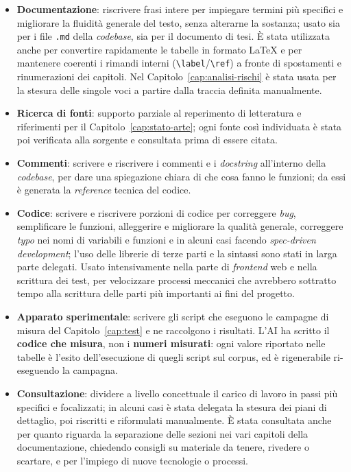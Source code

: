 \begin{itemize}
	\item \textbf{Documentazione}: riscrivere frasi intere per impiegare termini più specifici e migliorare la fluidità generale del testo, senza alterarne la sostanza; usato sia per i file \texttt{.md} della \textit{codebase}, sia per il documento di tesi. È stata utilizzata anche per convertire rapidamente le tabelle in formato \LaTeX{} e per mantenere coerenti i rimandi interni (\texttt{\textbackslash label}/\texttt{\textbackslash ref}) a fronte di spostamenti e rinumerazioni dei capitoli. Nel Capitolo~\ref{cap:analisi-rischi} è stata usata per la stesura delle singole voci a partire dalla traccia definita manualmente.
	\item \textbf{Ricerca di fonti}: supporto parziale al reperimento di letteratura e riferimenti per il Capitolo~\ref{cap:stato-arte}; ogni fonte così individuata è stata poi verificata alla sorgente e consultata prima di essere citata.
	\item \textbf{Commenti}: scrivere e riscrivere i commenti e i \textit{docstring} all'interno della \textit{codebase}, per dare una spiegazione chiara di che cosa fanno le funzioni; da essi è generata la \textit{reference} tecnica del codice.
	\item \textbf{Codice}: scrivere e riscrivere porzioni di codice per correggere \textit{bug}, semplificare le funzioni, alleggerire e migliorare la qualità generale, correggere \textit{typo} nei nomi di variabili e funzioni e in alcuni casi facendo \textit{spec-driven development}; l'uso delle librerie di terze parti e la sintassi sono stati in larga parte delegati. Usato intensivamente nella parte di \textit{frontend} web e nella scrittura dei test, per velocizzare processi meccanici che avrebbero sottratto tempo alla scrittura delle parti più importanti ai fini del progetto.
	\item \textbf{Apparato sperimentale}: scrivere gli script che eseguono le campagne di misura del Capitolo~\ref{cap:test} e ne raccolgono i risultati. L'AI ha scritto il \textbf{codice che misura}, non i \textbf{numeri misurati}: ogni valore riportato nelle tabelle è l'esito dell'esecuzione di quegli script sul corpus, ed è rigenerabile ri-eseguendo la campagna.
	\item \textbf{Consultazione}: dividere a livello concettuale il carico di lavoro in passi più specifici e focalizzati; in alcuni casi è stata delegata la stesura dei piani di dettaglio, poi riscritti e riformulati manualmente. È stata consultata anche per quanto riguarda la separazione delle sezioni nei vari capitoli della documentazione, chiedendo consigli su materiale da tenere, rivedere o scartare, e per l'impiego di nuove tecnologie o processi.
\end{itemize}

